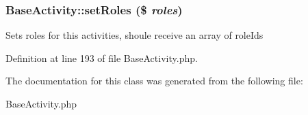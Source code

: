 \subsubsection{\setlength{\rightskip}{0pt plus 5cm}Base\-Activity::set\-Roles (\$ {\em roles})}\label{classBaseActivity_a20}


Sets roles for this activities, shoule receive an array of role\-Ids 

Definition at line 193 of file Base\-Activity.php.

The documentation for this class was generated from the following file:\begin{CompactItemize}
\item 
Base\-Activity.php\end{CompactItemize}

